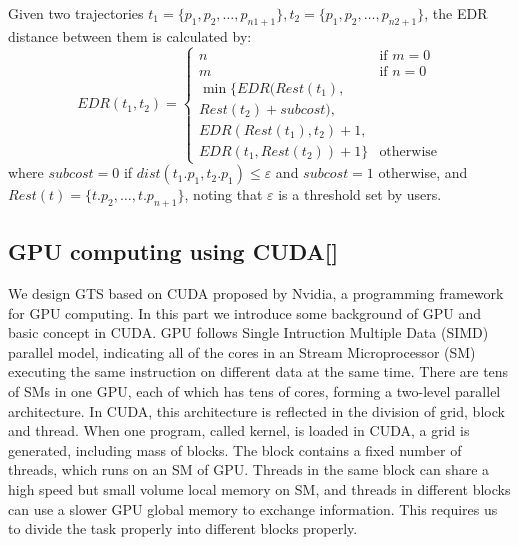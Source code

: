 \documentclass[conference]{IEEEtran}
\begin{document}
	\begin{define}
		Given two trajectories $t_{1}=\{p_{1},p_{2},\ldots,p_{n1+1}\},t_{2}=\{p_{1},p_{2},\ldots,p_{n2+1}\}$, the EDR distance between them is calculated by:
		\begin{equation}
		EDR(t_{1},t_{2}) = 
		\begin{cases}
		n & \text{if $m=0$} \\
		m & \text{if $n=0$} \\
		\min \{EDR(Rest(t_{1}),\\Rest(t_{2})+subcost),\\EDR(Rest(t_{1}),t_{2})+1,\\EDR(t_{1},Rest(t_{2}))+1\} & \text{otherwise}
		\end{cases}
		\end{equation}
		where $subcost = 0$ if $dist(t_{1}.p_{1},t_{2}.p_{1})\leqslant \varepsilon$ and $subcost = 1$ otherwise, and $Rest(t)=\{t.p_{2},\ldots ,t.p_{n+1}\}$, noting that $\varepsilon$ is a threshold set by users.
	\end{define}
	

\subsection{GPU computing using CUDA[]}
We design GTS based on CUDA proposed by Nvidia, a programming framework for GPU computing. In this part we introduce some background of GPU and basic concept in CUDA. GPU follows Single Intruction Multiple Data (SIMD) parallel model, indicating all of the cores in an Stream Microprocessor (SM) executing the same instruction on different data at the same time. There are tens of SMs in one GPU, each of which has tens of cores, forming a two-level parallel architecture. In CUDA, this architecture is reflected in the division of grid, block and thread. When one program, called kernel, is loaded in CUDA, a grid is generated, including mass of blocks. The block contains a fixed number of threads, which runs on an SM of GPU. Threads in the same block can share a high speed but small volume local memory on SM, and threads in different blocks can use a slower GPU global memory to exchange information. This requires us to divide the task properly into different blocks properly. 
\end{document}
